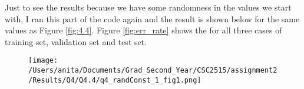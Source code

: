 \documentclass[10pt]{article}
\begin{document}
Just to see the results because we have some randomness in the values we start with, I ran this part of the code again and the result is shown below for the same values as Figure \ref{fig:4.4}.
Figure \ref{fig:err_rate} shows the for all three cases of training set, validation set and test set.
\begin{figure}[H]
	\centering
	\texttt{[image: /Users/anita/Documents/Grad\_Second\_Year/CSC2515/assignment2/Results/Q4/Q4.4/q4\_randConst\_1\_fig1.png]}
	\caption{}
	\label{fig:q4.4}
\end{figure}
\end{document}

